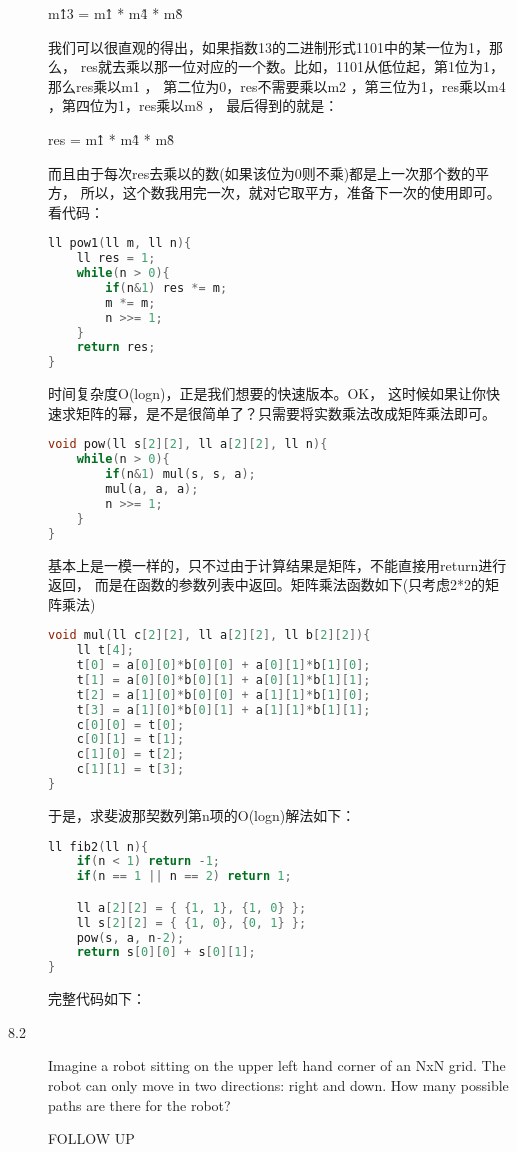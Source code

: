 \begin{description}
m\^13 = m\^1 * m\^4 * m\^8

我们可以很直观的得出，如果指数13的二进制形式1101中的某一位为1，那么， res就去乘以那一位对应的一个数。比如，1101从低位起，第1位为1，那么res乘以m1 ， 第二位为0，res不需要乘以m2 ，第三位为1，res乘以m4 ，第四位为1，res乘以m8 ， 最后得到的就是：

res = m\^1 * m\^4 * m\^8

而且由于每次res去乘以的数(如果该位为0则不乘)都是上一次那个数的平方， 所以，这个数我用完一次，就对它取平方，准备下一次的使用即可。看代码：
\begin{lstlisting}[language=C++]
ll pow1(ll m, ll n){
    ll res = 1;
    while(n > 0){
        if(n&1) res *= m;
        m *= m;
        n >>= 1;
    }
    return res;
}
\end{lstlisting}
时间复杂度O(logn)，正是我们想要的快速版本。OK， 这时候如果让你快速求矩阵的幂，是不是很简单了？只需要将实数乘法改成矩阵乘法即可。
\begin{lstlisting}[language=C++]
void pow(ll s[2][2], ll a[2][2], ll n){
    while(n > 0){
        if(n&1) mul(s, s, a);
        mul(a, a, a);
        n >>= 1;
    }
}
\end{lstlisting}
基本上是一模一样的，只不过由于计算结果是矩阵，不能直接用return进行返回， 而是在函数的参数列表中返回。矩阵乘法函数如下(只考虑2*2的矩阵乘法)
\begin{lstlisting}[language=C++]
void mul(ll c[2][2], ll a[2][2], ll b[2][2]){
    ll t[4];
    t[0] = a[0][0]*b[0][0] + a[0][1]*b[1][0];
    t[1] = a[0][0]*b[0][1] + a[0][1]*b[1][1];
    t[2] = a[1][0]*b[0][0] + a[1][1]*b[1][0];
    t[3] = a[1][0]*b[0][1] + a[1][1]*b[1][1];
    c[0][0] = t[0];
    c[0][1] = t[1];
    c[1][0] = t[2];
    c[1][1] = t[3];
}
\end{lstlisting}
于是，求斐波那契数列第n项的O(logn)解法如下：
\begin{lstlisting}[language=C++]
ll fib2(ll n){
    if(n < 1) return -1;
    if(n == 1 || n == 2) return 1;

    ll a[2][2] = { {1, 1}, {1, 0} };
    ll s[2][2] = { {1, 0}, {0, 1} };
    pow(s, a, n-2);
    return s[0][0] + s[0][1];
}
\end{lstlisting}
完整代码如下：



\item[8.2] Imagine a robot sitting on the upper left hand corner of an NxN grid. The robot can only move in two directions: right and down. How many possible paths are there for the robot?

FOLLOW UP


\end{description}
